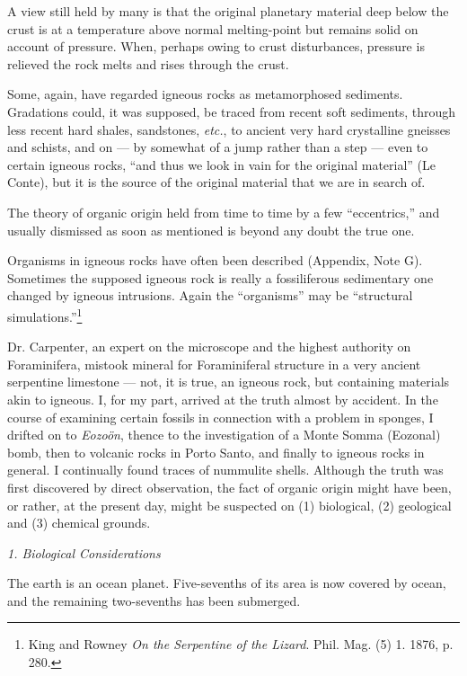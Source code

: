 \documentclass[a4paper, 12pt, oneside]{article}
\begin{document}
A view still held by many is that the original planetary material deep below the crust is at a temperature above normal melting-point but remains solid on account of pressure. When, perhaps owing to crust disturbances, pressure is relieved the rock melts and rises through the crust.

Some, again, have regarded igneous rocks as metamorphosed sediments. Gradations could, it was supposed, be traced from recent soft sediments, through less recent hard shales, sandstones, \emph{etc.}, to ancient very hard crystalline gneisses and schists, and on --- by somewhat of a jump rather than a step --- even to certain igneous rocks, ``and thus we look in vain for the original material'' (Le Conte), but it is the source of the original material that we are in search of.

The theory of organic origin held from time to time by a few ``eccentrics,'' and usually dismissed as soon as mentioned is beyond any doubt the true one.

Organisms in igneous rocks have often been described (Appendix, Note G). Sometimes the supposed igneous rock is really a fossiliferous sedimentary one changed by igneous intrusions. Again the ``organisms'' may be ``structural simulations.''\footnote{King and Rowney \emph{On the Serpentine of the Lizard}. Phil. Mag. (5) 1. 1876, p. 280.}

Dr. Carpenter, an expert on the microscope and the highest authority on Foraminifera, mistook mineral for Foraminiferal structure in a very ancient serpentine limestone --- not, it is true, an igneous rock, but containing materials akin to igneous. I, for my part, arrived at the truth almost by accident. In the course of examining certain fossils in connection with a problem in sponges, I drifted on to \emph{Eozoön}, thence to the investigation of a Monte Somma (Eozonal) bomb, then to volcanic rocks in Porto Santo, and finally to igneous rocks in general. I continually found traces of nummulite shells. Although the truth was first discovered by direct observation, the fact of organic origin might have been, or rather, at the present day, might be suspected on (1) biological, (2) geological and (3) chemical grounds.

\bigskip
\centerline{\emph{1. Biological Considerations}}

The earth is an ocean planet. Five-sevenths of its area is now covered by ocean, and the remaining two-sevenths has been submerged.
\end{document}
